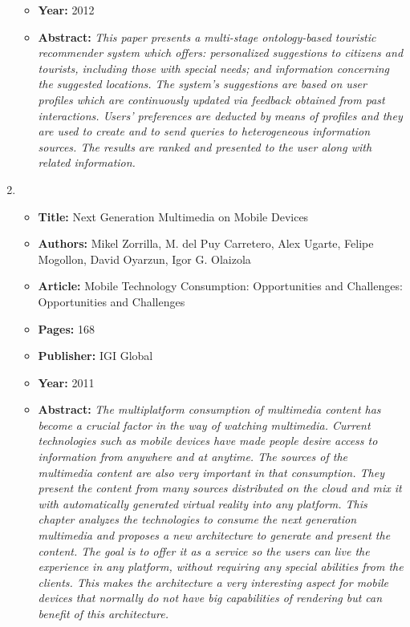 \begin{enumerate}
\begin{itemize}
	\item \textbf{Year:} 2012
	\item \textbf{Abstract:} \textit{This paper presents a multi-stage ontology-based touristic recommender system which offers: personalized suggestions to citizens and tourists, including those with special needs; and information concerning the suggested locations. The system's suggestions are based on user profiles which are continuously updated via feedback obtained from past interactions. Users' preferences are deducted by means of profiles and they are used to create and to send queries to heterogeneous information sources. The results are ranked and presented to the user along with related information.}
\end{itemize}
\hrulefill
\item 
\begin{itemize} \itemsep1pt\parskip0pt
	\item \textbf{Title:} Next Generation Multimedia on Mobile Devices
	\item \textbf{Authors:} Mikel Zorrilla, M. del Puy Carretero, Alex Ugarte, Felipe Mogollon, David Oyarzun, Igor G. Olaizola
	\item \textbf{Article:} Mobile Technology Consumption: Opportunities and Challenges: Opportunities and Challenges
	\item \textbf{Pages:} 168
 	\item \textbf{Publisher:} IGI Global
	\item \textbf{Year:} 2011
	\item \textbf{Abstract:} \textit{The multiplatform consumption of multimedia content has become a crucial factor in the way of watching multimedia. Current technologies such as mobile devices have made people desire access to information from anywhere and at anytime. The sources of the multimedia content are also very important in that consumption. They present the content from many sources distributed on the cloud and mix it with automatically generated virtual reality into any platform. This chapter analyzes the technologies to consume the next generation multimedia and proposes a new architecture to generate and present the content. The goal is to offer it as a service so the users can live the experience in any platform, without requiring any special abilities from the clients. This makes the architecture a very interesting aspect for mobile devices that normally do not have big capabilities of rendering but can benefit of this architecture.}
\end{itemize}
\hrulefill

\end{enumerate}

